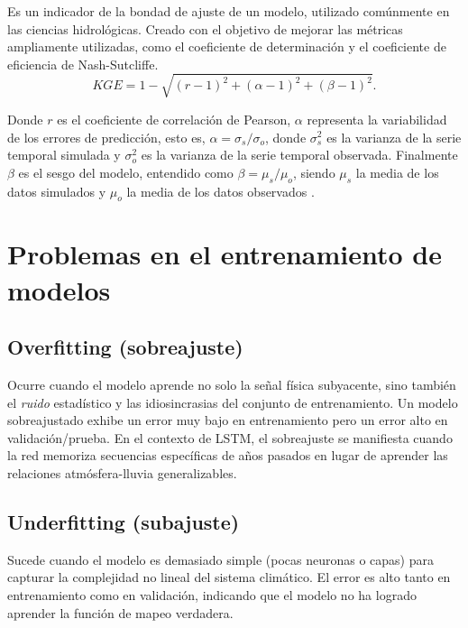 Es un indicador de la bondad de ajuste de un modelo, utilizado comúnmente en las ciencias hidrológicas. Creado con el objetivo de mejorar las métricas ampliamente utilizadas, como el coeficiente de determinación y el coeficiente de eficiencia de Nash-Sutcliffe.
\begin{equation}
    KGE = 1 -\sqrt{(r-1)^2+(\alpha-1)^2+(\beta-1)^2}.
\end{equation}

Donde $r$ es el coeficiente de correlación de Pearson, $\alpha$ representa la variabilidad de los errores de predicción, esto es, $\alpha=\sigma_s/\sigma_o$, donde $\sigma_s^2$ es la varianza de la serie temporal simulada y $\sigma_o^2$ es la varianza de la serie temporal observada. Finalmente $\beta$ es el sesgo del modelo, entendido como $\beta=\mu_s/\mu_o$, siendo $\mu_s$ la media de los datos simulados y $\mu_o$ la media de los datos observados \citep{Kling-Gupta}.

\section{Problemas en el entrenamiento de modelos}

\subsection{Overfitting (sobreajuste)}
Ocurre cuando el modelo aprende no solo la señal física subyacente, sino también el \textit{ruido} estadístico y las idiosincrasias del conjunto de entrenamiento. Un modelo sobreajustado exhibe un error muy bajo en entrenamiento pero un error alto en validación/prueba. En el contexto de LSTM, el sobreajuste se manifiesta cuando la red memoriza secuencias específicas de años pasados en lugar de aprender las relaciones atmósfera-lluvia generalizables.

\subsection{Underfitting (subajuste)}
Sucede cuando el modelo es demasiado simple (pocas neuronas o capas) para capturar la complejidad no lineal del sistema climático. El error es alto tanto en entrenamiento como en validación, indicando que el modelo no ha logrado aprender la función de mapeo verdadera.

